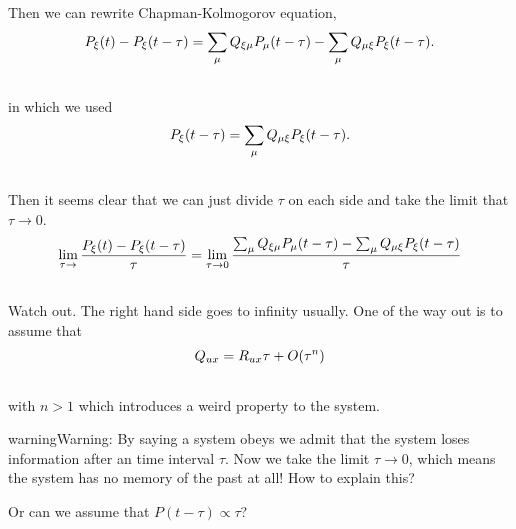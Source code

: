\documentclass[letterpaper,10pt,english]{sphinxmanual}
\begin{document}
Then we can rewrite Chapman-Kolmogorov equation,
\begin{gather}
\begin{split}P_\xi(t) - P_\xi(t-\tau) = \sum_\mu Q_{\xi\mu}P_\mu(t-\tau) - \sum_\mu Q_{\mu\xi} P_\xi(t-\tau) .\end{split}\notag\\\begin{split}\end{split}\notag
\end{gather}
in which we used
\begin{gather}
\begin{split}P_\xi(t-\tau) = \sum_\mu Q_{\mu\xi} P_\xi(t-\tau) .\end{split}\notag\\\begin{split}\end{split}\notag
\end{gather}
Then it seems clear that we can just divide $\tau$ on each side and take the limit that $\tau\rightarrow 0$.
\begin{gather}
\begin{split}\lim_{\tau\rightarrow} \frac{P_\xi(t) - P_\xi(t-\tau)}{\tau} = \lim_{\tau\rightarrow 0} \frac{ \sum_\mu Q_{\xi\mu}P_\mu(t-\tau) - \sum_\mu Q_{\mu\xi} P_\xi(t-\tau) }{\tau}\end{split}\notag\\\begin{split}\end{split}\notag
\end{gather}
Watch out. The right hand side goes to infinity usually. One of the way out is to assume that
\begin{gather}
\begin{split}Q_{ux} = R_{ux}\tau + O(\tau^n)\end{split}\notag\\\begin{split}\end{split}\notag
\end{gather}
with $n > 1$ which introduces a weird property to the system.

\begin{notice}{warning}{Warning:}
By saying a system obeys  we admit that the system loses information after an time interval $\tau$. Now we take the limit $\tau\rightarrow 0$, which means the system has no memory of the past at all! How to explain this?

Or can we assume that $P(t-\tau)\propto \tau$?
\end{notice}
\end{document}
